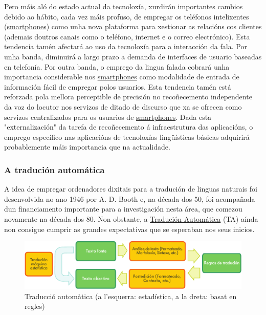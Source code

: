 \begin{multicols}{2}
Pero máis aló do estado actual da tecnoloxía, xurdirán importantes cambios debido ao hábito, cada vez máis profuso, de empregar os teléfonos intelixentes (\uline{smartphones}) como unha nova plataforma para xestionar as relacións cos clientes (ademais doutros canais como o teléfono, internet e o correo electrónico). Esta tendencia tamén afectará ao uso da tecnoloxía para a interacción da fala. Por unha banda, diminuirá a largo prazo a demanda de interfaces de usuario baseadas en telefonía. Por outra banda, o emprego da lingua falada cobrará unha importancia considerable nos \uline{smartphones} como modalidade de entrada de información fácil de empregar polos usuarios. Esta tendencia tamén está reforzada pola mellora perceptible de precisión no recoñecemento independente da voz do locutor nos servizos de ditado de discurso que xa se ofrecen como servizos centralizados para os usuarios de \uline{smartphones}. Dada esta "externalización" da tarefa de recoñecemento á infraestrutura das aplicacións, o emprego específico nas aplicacións de tecnoloxías lingüísticas básicas adquirirá probablemente máis importancia que na actualidade. 

\subsubsection{A tradución automática}

  A idea de empregar ordenadores dixitais para a tradución de linguas naturais foi desenvolvida no ano 1946 por A. D. Booth e, na década dos 50, foi acompañada dun financiamento importante para a investigación nesta área, que comezou novamente na década dos 80. Non obstante, a \uline{Tradución Automática} (TA) aínda non consigue cumprir as grandes expectativas que se esperaban nos seus inicios. 

   


\begin{figure}[htb]
  \vspace{-21mm}
  \center
  \includegraphics[width=\textwidth]{../_media/galician/machine_translation}
  \vspace{-2mm}
  \caption{Traducció automàtica (a l'esquerra: estadística, a la dreta: basat en regles)}
  \label{fig:mtarch_ga}
\end{figure}


\end{multicols}
